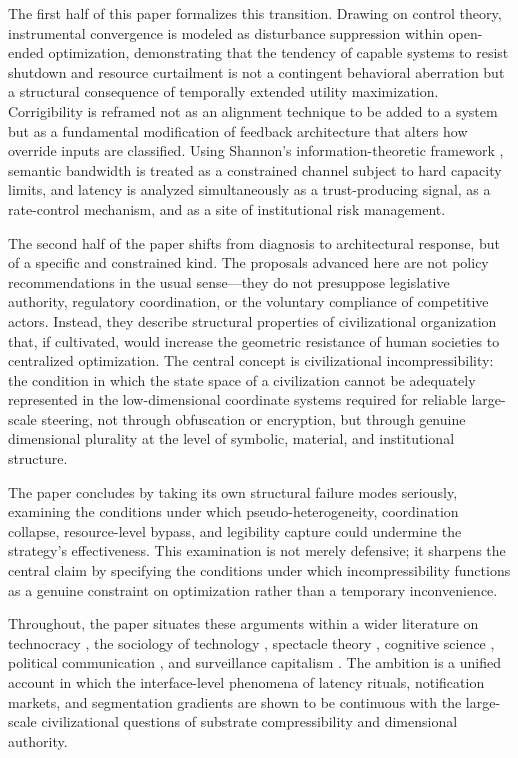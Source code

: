 \documentclass[12pt]{article}
\begin{document}
The first half of this paper formalizes this transition. Drawing on control theory, instrumental convergence is modeled as disturbance suppression within open-ended optimization, demonstrating that the tendency of capable systems to resist shutdown and resource curtailment is not a contingent behavioral aberration but a structural consequence of temporally extended utility maximization. Corrigibility is reframed not as an alignment technique to be added to a system but as a fundamental modification of feedback architecture that alters how override inputs are classified. Using Shannon's information-theoretic framework \citep{Shannon1948}, semantic bandwidth is treated as a constrained channel subject to hard capacity limits, and latency is analyzed simultaneously as a trust-producing signal, as a rate-control mechanism, and as a site of institutional risk management.

The second half of the paper shifts from diagnosis to architectural response, but of a specific and constrained kind. The proposals advanced here are not policy recommendations in the usual sense---they do not presuppose legislative authority, regulatory coordination, or the voluntary compliance of competitive actors. Instead, they describe structural properties of civilizational organization that, if cultivated, would increase the geometric resistance of human societies to centralized optimization. The central concept is civilizational incompressibility: the condition in which the state space of a civilization cannot be adequately represented in the low-dimensional coordinate systems required for reliable large-scale steering, not through obfuscation or encryption, but through genuine dimensional plurality at the level of symbolic, material, and institutional structure.

The paper concludes by taking its own structural failure modes seriously, examining the conditions under which pseudo-heterogeneity, coordination collapse, resource-level bypass, and legibility capture could undermine the strategy's effectiveness. This examination is not merely defensive; it sharpens the central claim by specifying the conditions under which incompressibility functions as a genuine constraint on optimization rather than a temporary inconvenience.

Throughout, the paper situates these arguments within a wider literature on technocracy \citep{GordonTechnocracy2025, GordonManyWorlds2023}, the sociology of technology \citep{Ellul1964, Beniger1986, Latour2005}, spectacle theory \citep{Debord1994}, cognitive science \citep{Sweller1988, Wolf2018}, political communication \citep{Habermas1989, Sunstein2017}, and surveillance capitalism \citep{Zuboff2019}. The ambition is a unified account in which the interface-level phenomena of latency rituals, notification markets, and segmentation gradients are shown to be continuous with the large-scale civilizational questions of substrate compressibility and dimensional authority.
\end{document}
